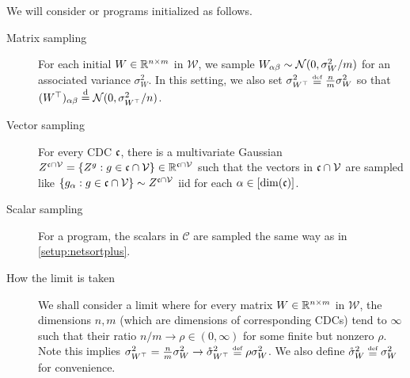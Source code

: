 \documentclass[main.tex]{subfiles}
\begin{document}
\begin{setup}\label{setup:netsortVarDim}
    We will consider \netsort{} or \netsortplus{} programs initialized as follows.
    \begin{description}
        \item[Matrix sampling] For each initial $W\in\mathbb{R}^{n\times m}$ in $\mathcal{W}$, we sample $W_{\alpha\beta}\sim\mathcal{N}(0,\sigma_{W}^{2}/m)$ for an associated variance $\sigma_{W}^{2}$. In this setting, we also set $\sigma_{W^{\trsp}}^{2}\defeq\frac{n}{m}\sigma_{W}^{2}$ so that $(W^{\top})_{\alpha\beta}\overset{\mathrm{d}}{=}\mathcal{N}(0,\sigma_{W^{\top}}^{2}/n)$.
        \item[Vector sampling] For every CDC $\mathfrak{c}$, there is a multivariate Gaussian $Z^{\mathfrak{c}\cap\mathcal{V}}=\left\{ Z^{g}:g\in\mathfrak{c}\cap\mathcal{V}\right\} \in\mathbb{R}^{\mathfrak{c}\cap\mathcal{V}}$ such that the vectors in $\mathfrak{c}\cap\mathcal{V}$ are sampled like $\left\{ g_{\alpha}:g\in\mathfrak{c}\cap\mathcal{V}\right\} \sim Z^{\mathfrak{c}\cap\mathcal{V}}$ iid for each $\alpha\in[\dim(\mathfrak{c})]$. 
        \item[Scalar sampling] For a \netsortplus{} program, the scalars in $\mathcal{C}$ are sampled the same way as in \cref{setup:netsortplus}.
        \item[How the limit is taken] We shall consider a limit where for every matrix $W\in\mathbb{R}^{n\times m}$ in $\mathcal W$, the dimensions $n,m$ (which are dimensions of corresponding CDCs) tend to $\infty$ such that their ratio $n/m\to\rho\in(0,\infty)$ for some finite but nonzero $\rho$. Note this implies $\sigma_{W^{\trsp}}^{2}=\frac{n}{m}\sigma_{W}^{2}\to\mathring{\sigma}_{W^{\trsp}}^{2}\defeq\rho\sigma_{W}^{2}$. We also define $\mathring{\sigma}_{W}^{2}\defeq\sigma_{W}^{2}$ for convenience.
    \end{description}
\end{setup}
\end{document}

